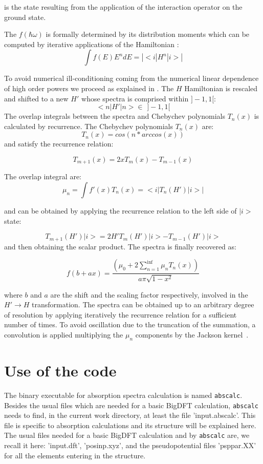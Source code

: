 \documentclass[a4paper,11pt]{report}
\begin{document}
is the state resulting from the application of the interaction operator on the ground state.

 The $f(\hbar \omega)$ is formally determined by its distribution moments
which can be computed by iterative applications of the Hamiltonian :
\begin{equation}
  \int  f(E) E^n d E = \left| < i | H^n| i > \right|
\end{equation}

To avoid numerical ill-conditioning coming from the numerical linear dependence of  high order powers we proceed as explained in \cite{weiss}.
 The $H$ Hamiltonian is rescaled  and shifted to a new $H'$ whose spectra
is comprised within $]-1,1[$:
$$   < n | H' | n > \in \,\, ]-1,1[ $$
The overlap integrals between the spectra and Chebychev polynomials $T_n(x)$ is calculated by recurrence.
The Chebychev polynomials $T_n(x)$ are:
$$  T_n(x) = cos( n * arccos(x)) $$
and satisfy the recurrence relation:

$$ T_{m+1}(x) = 2 x T_m(x) - T_{m-1} (x)$$

The overlap integral are:
$$\mu_n =  \int  f'(x) T_n(x) = < i |  T_n(H') | i > | $$

and can be obtained by applying the recurrence relation to the left side of $|i>$ state:

$$ T_{m+1}(H')| i > = 2 H' T_m(H')| i > - T_{m-1} (H')| i > $$
and then obtaining the scalar product. The spectra is finally recovered as:

$$  f( b+a x) = \frac{  (\mu_0+ 2 \sum_{n=1}^{\inf} \mu_n T_n(x)) }{a \pi \sqrt{1 - x^2} } $$

where $b$ and $a$ are the shift and the scaling factor respectively, involved in the $ H' \rightarrow H $ transformation.
The spectra can be obtained up to an arbitrary degree of resolution by
applying iteratively the recurrence relation for a sufficient number of times. To avoid oscillation
due to the truncation of the summation, a convolution is applied multiplying the $\mu_n$ 
components by the Jackson kernel~\cite{weiss}. 


\section{Use of the code}

The binary executable for absorption spectra calculation is named \texttt{abscalc}.
 Besides the usual files which  are needed for
a basic BigDFT calculation,  \texttt{abscalc} needs to find, 
 in the current  work directory, at least the file  '{input.abscalc}'. 
This file is specific to absorption calculations and 
its structure will be explained here.
The  usual files needed for a basic BigDFT calculation and by \texttt{abscalc} are, 
we recall it here: '{input.dft}', '{posinp.xyz}', and the pseudopotential files '{psppar.XX}' for
all the elements entering in the structure.
\end{document}
